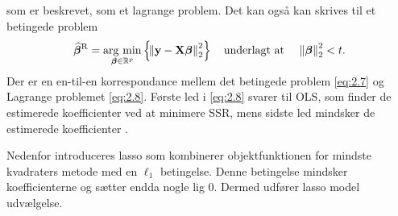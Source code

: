 som er beskrevet, som et lagrange problem. 
Det kan også kan skrives til et betingede problem 
\begin{align}
 \widehat{\boldsymbol\beta}^{\text{R}} = \underset{\boldsymbol{\beta} \in \R^p}{\argmin} \cbr{\norm{\y - \X\boldsymbol\beta}^2_2} \quad \text{underlagt at } \quad \norm{\boldsymbol\beta}_2^2 < t \label{eq:2.7}.
\end{align}
Der er en en-til-en korrespondance mellem det betingede problem \eqref{eq:2.7} og Lagrange problemet \eqref{eq:2.8}.
Første led i \eqref{eq:2.8} svarer til OLS, som finder de estimerede koefficienter ved at minimere SSR, mens sidste led mindsker de estimerede koefficienter .



%





Nedenfor introduceres lasso som kombinerer objektfunktionen for mindste kvadraters metode med en $\ell_1$ betingelse. Denne betingelse mindsker koefficienterne og sætter endda nogle lig 0. Dermed udfører lasso model udvælgelse.


